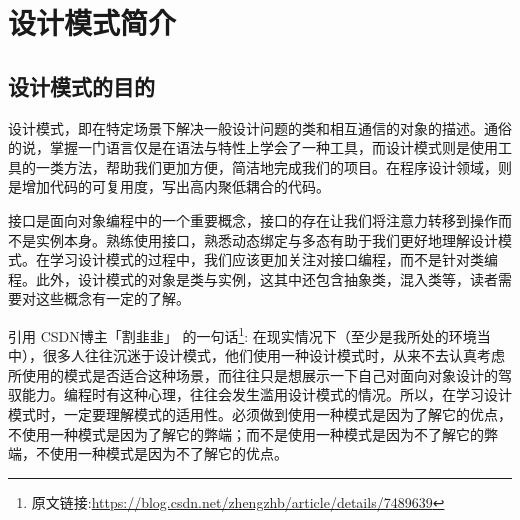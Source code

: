 \section*{设计模式简介}


\subsection*{设计模式的目的}

设计模式，即在特定场景下解决一般设计问题的类和相互通信的对象的描述。通俗的说，掌握一门语言仅是在语法与特性上学会了一种工具，而设计模式则是使用工具的一类方法，帮助我们更加方便，简洁地完成我们的项目。在程序设计领域，则是增加代码的可复用度，写出高内聚低耦合的代码。

接口是面向对象编程中的一个重要概念，接口的存在让我们将注意力转移到操作而不是实例本身。熟练使用接口，熟悉动态绑定与多态有助于我们更好地理解设计模式。在学习设计模式的过程中，我们应该更加关注对接口编程，而不是针对类编程。此外，设计模式的对象是类与实例，这其中还包含抽象类，混入类等，读者需要对这些概念有一定的了解。

引用 CSDN博主「割韭韭」 的一句话\footnote{原文链接:\url{https://blog.csdn.net/zhengzhb/article/details/7489639}}:
在现实情况下（至少是我所处的环境当中），很多人往往沉迷于设计模式，他们使用一种设计模式时，从来不去认真考虑所使用的模式是否适合这种场景，而往往只是想展示一下自己对面向对象设计的驾驭能力。编程时有这种心理，往往会发生滥用设计模式的情况。所以，在学习设计模式时，一定要理解模式的适用性。必须做到使用一种模式是因为了解它的优点，不使用一种模式是因为了解它的弊端；而不是使用一种模式是因为不了解它的弊端，不使用一种模式是因为不了解它的优点。

